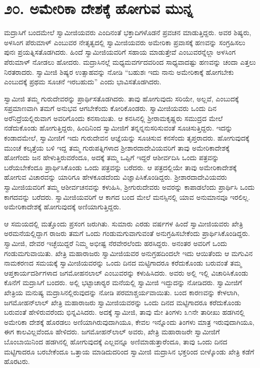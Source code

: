 
\chapter*{೨೦. ಅಮೇರಿಕಾ ದೇಶಕ್ಕೆ ಹೋಗುವ ಮುನ್ನ}

 ಮದ್ರಾಸಿಗೆ ಬಂದಮೇಲೆ ಸ್ವಾಮೀಜಿಯವರು ಎಂದಿನಂತೆ ಭಕ್ತಾದಿಗಳೊಡನೆ ಪ್ರವಚನ ಮಾಡುತ್ತಿದ್ದರು. ಅವರ ಶಿಷ್ಯರು, ಅಳಸಿಂಗ ಪೆರುಮಾಳ್ ಎಂಬುವರ ನೇತೃತ್ವದಲ್ಲಿ ಸ್ವಾಮೀಜಿಯವರು ಅಮೇರಿಕಾ ಪ್ರವಾಸಕ್ಕೆ ಹಣವನ್ನು ಸಂಗ್ರಹಿಸಲು ಪುನಃ ಪ್ರಯತ್ನಿಸತೊಡಗಿದರು. ಹಿಂದೆ ಸ್ವಾಮೀಜಿಯವರಿಗೆ ಸಹಾಯ ಮಾಡುತ್ತೇವೆ ಎಂಬುವರನ್ನೆಲ್ಲಾ ಅಳಸಿಂಗ ಪೆರುಮಾಳ್ ನೋಡಲು ಹೋದರು. ಮದ್ರಾಸಿನಲ್ಲೆ ಮಧ್ಯಮವರ್ಗದವರಿಂದ ಸಾಧ್ಯವಾದಷ್ಟು ಹಣವನ್ನು ಚಂದಾ ಎತ್ತಲು ನಿರತರಾದರು. ಸ್ವಾಮೀಜಿ ಶಿಷ್ಯರ ಉತ್ಸಾಹವನ್ನು ನೋಡಿ “ಬಹುಶಃ ಇದು ನಾನು ಅಮೇರಿಕಾಕ್ಕೆ ಹೋಗಬೇಕು ಎಂಬುದಕ್ಕೆ ಪ್ರಥಮ ಸೂಚನೆ ಇರಬಹುದು” ಎಂದು ಭಾವಿಸತೊಡಗಿದರು. 

 ಸ್ವಾಮೀಜಿ ತಮ್ಮ ಗುರುದೇವರನ್ನು ಪ್ರಾರ್ಥಿಸತೊಡಗಿದರು. ತಾವು ಹೋಗುವುದು ಸರಿಯೇ, ಅಲ್ಲವೆ, ಎಂಬುದಕ್ಕೆ ಸಪ್ರಮಾಣವಾಗಿ ತಮಗೆ ಅನುಭವ ಆಗಬೇಕೆಂದು ಕೋರಿಕೊಂಡರು. ಸ್ವಾಮೀಜಿಯವರು ಒಂದು ದಿನ ಅರೆನಿದ್ರೆಯಲ್ಲಿರುವಾಗ ಅವರಿಗೊಂದು ಕನಸಾಯಿತು. ಆ ಕನಸಿನಲ್ಲಿ ಶ‍್ರೀರಾಮಕೃಷ್ಣರು ಸಮುದ್ರದ ಮೇಲೆ ನಡೆದುಕೊಂಡು ಹೋಗುತ್ತಿದ್ದರು, ಹಿಂದಿನಿಂದ ಸ್ವಾಮೀಜಿಗೆ ತನ್ನನ್ನನುಸರಿಸುವಂತೆ ಸೂಚಿಸುತ್ತಿದ್ದರು. ಇದನ್ನು ಕಂಡಾದಮೇಲೆ, ಸ್ವಾಮೀಜಿಗೆ ಇದು ಗುರುದೇವನ ಆಜ್ಞೆಯನ್ನು ಸೂಚಿಸುವ ಕನಸೆಂದು ತೃಪ್ತರಾದರು. ಹೋಗುವುದಕ್ಕೆ ಮುಂಚೆ ಕಲ್ಕತ್ತೆಯ ಬಳಿ ಇದ್ದ ತಮ್ಮ ಗುರುಪತ್ನಿಗಳಾದ ಶ‍್ರೀಶಾರದಾದೇವಿಯವರಿಗೆ ತಾವು ಅಮೇರಿಕಾದೇಶಕ್ಕೆ ಹೋಗೆಂದು ಜನ ಹೇಳುತ್ತಿರುವರೆಂದೂ, ಅದಕ್ಕೆ ತಮ್ಮ ಒಪ್ಪಿಗೆ ಇದ್ದರೆ ಆಶೀರ್ವದಿಸಿ ಒಂದು ಪತ್ರವನ್ನು ಬರೆಯಬೇಕೆಂದೂ ಪ್ರಾರ್ಥಿಸಿಕೊಂಡು ಒಂದು ಪತ್ರವನ್ನು ಬರೆದರು. ಆ ಪತ್ರದಲ್ಲಿಯೇ ತಾವು ಅಮೇರಿಕಾದೇಶಕ್ಕೆ ಹೋಗುವ ವಿಚಾರವನ್ನು ಯಾರಿಗೂ ಹೇಳಕೂಡದೆಂದು ವಿಜ್ಞಾಪಿಸಿಕೊಂಡಿದ್ದರು. ಶ‍್ರೀಶಾರದಾದೇವಿಯವರು ಸ್ವಾಮೀಜಿಯವರಿಗೆ ತಮ್ಮ ಆಶೀರ್ವಚನವನ್ನು ಕಳುಹಿಸಿ, ಶ‍್ರೀಗುರುದೇವರು ಅವರನ್ನು ಕಾಪಾಡಲೆಂದು ಪ್ರಾರ್ಥಿಸಿ ಒಂದು ಕಾಗದವನ್ನು ಬರೆದರು. ಸ್ವಾಮೀಜಿಯವರಿಗೆ ಆ ಕಾಗದ ಬಂದ ಮೇಲೆ ಮನಸ್ಸಿನಲ್ಲಿ ಯಾವ ಅನುಮಾನವೂ ಇರಲಿಲ್ಲ. ಅಮೇರಿಕಾದೇಶಕ್ಕೆ ಹೋಗುವುದಕ್ಕೆ ಅಣಿಯಾಗುತ್ತಿದ್ದರು. 

 ಆ ಸಮಯದಲ್ಲಿ ಮತ್ತೊಂದು ಪ್ರಸಂಗ ಜರುಗಿತು. ಸುಮಾರು ಎರಡು ವರ್ಷಗಳ ಹಿಂದೆ ಸ್ವಾಮೀಜಿಯವರು ಖೇತ್ರಿ ಅರಮನೆಯಲ್ಲಿದ್ದಾಗ ರಾಜರು ತಮಗೆ ಒಂದು ಗಂಡುಮಗುವಾಗುವಂತೆ ಅನುಗ್ರಹಿಸಬೇಕೆಂದು ಪ್ರಾರ್ಥಿಸಿಕೊಂಡಿದ್ದರು. ಸ್ವಾಮೀಜಿ, ದೇವರ ಇಚ್ಛೆಯಿದ್ದರೆ ನಿಮ್ಮ ಅಭೀಷ್ಟ ನೆರವೇರಲೆಂದು ಹರಸಿದ್ದರು. ಅನಂತರ ಅವರಿಗೆ ಒಂದು ಗಂಡುಮಗುವಾಯಿತು. ಖೇತ್ರಿ ಮಹಾರಾಜರು ಸ್ವಾಮೀಜಿಯವರ ಅನುಗ್ರಹದಿಂದಲೇ ಇದು ಆಯಿತೆಂದು ಆ ಮಗುವಿನ ನಾಮಕರಣದ ಸಮಯಕ್ಕೆ ಸ್ವಾಮೀಜಿಯವರನ್ನು ಒಂದು ದಿನದ ಮಟ್ಟಿಗಾದರೂ ಕರೆದುಕೊಂಡು ಬರುವಂತೆ ತಮ್ಮ ಆಪ್ತಕಾರ್ಯದರ್ಶಿಗಳಾದ ಜಗಮೋಹನಲಾಲ್ ಎಂಬುವರನ್ನು ಕಳುಹಿಸಿದರು. ಅವರು ಅಲ್ಲಿ ಇಲ್ಲಿ ವಿಚಾರಿಸಿಕೊಂಡು ಕೊನೆಗೆ ಮದ್ರಾಸಿಗೆ ಬಂದರು. ಅಲ್ಲಿ ಭಟ್ಟಾಚಾರ‍್ಯರ ಮನೆಯಲ್ಲಿ ಸ್ವಾಮೀಜಿ ಇದ್ದುದನ್ನು ನೋಡಿದರು. ಸ್ವಾಮೀಜಿಗೆ ಖೇತ್ರಿಯ ಮನುಷ್ಯ ಮದ್ರಾಸಿನಲ್ಲಿರುವುದನ್ನು ನೋಡಿ ಪರಮಾಶ್ಚರ್ಯವಾಯಿತು. ಬಂದ ಕಾರಣವನ್ನು ಕೇಳಲಾಗಿ, ಜಗಮೋಹನ್‍ಲಾಲ್ ಖೇತ್ರಿ ಮಹಾರಾಜರು ಸ್ವಾಮೀಜಿಯವರನ್ನು ಒಂದು ದಿನದ ಮಟ್ಟಿಗಾದರೂ ಕರೆದುಕೊಂಡು ಬರುವಂತೆ ಹೇಳಿರುವರೆಂದು ಭಿನ್ನವಿಸಿದರು. ಅದಕ್ಕೆ ಸ್ವಾಮೀಜಿ, ತಾವು ಮೇ ತಿಂಗಳು ೩೧ನೇ ತಾರೀಖು ಹಡಗಿನಲ್ಲಿ ಅಮೇರಿಕಾ ದೇಶಕ್ಕೆ ಹೊರಡಲು ಅಣಿಯಾಗಿರುವುದಾಗಿಯೂ, ಕೇವಲ ಇನ್ನೊಂದು ತಿಂಗಳು ಮಾತ್ರ ಇರುವುದಾಗಿಯೂ, ಈಗ ಕಾಲವಿಲ್ಲವೆಂದೂ ಹೇಳಿದರು. ಜಗಮೋಹನ್‍ಲಾಲ್ ಅವರು, ಖೇತ್ರಿ ಮಹಾರಾಜರೇ ಸ್ವಾಮೀಜಿಗೆ ಬೊಂಬಾಯಿನಿಂದ ಹಡಗಿನಲ್ಲಿ ಹೋಗುವುದಕ್ಕೆ ಎಲ್ಲವನ್ನೂ ಅಣಿಮಾಡುತ್ತಾರೆಂದೂ, ತಾವು ಒಂದು ದಿನದ ಮಟ್ಟಿಗಾದರೂ ಬರಬೇಕೆಂದೂ ಒತ್ತಾಯ ಮಾಡಿದುದರಿಂದ ಸ್ವಾಮೀಜಿ ಮದ್ರಾಸಿನ ಭಕ್ತರಿಂದ ಬೀಳ್ಕೊಂಡು ಖೇತ್ರಿ ಕಡೆಗೆ ಹೊರಟರು. 

